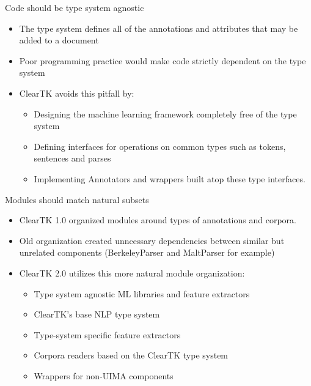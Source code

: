 \documentclass[final]{beamer}
\begin{document}
\begin{frame}{}
\begin{columns}[t]

  \begin{column}{.45\linewidth}
    \begin{block}{Code should be type system agnostic}
    \begin{itemize}
            \item The type system defines all of the annotations and attributes that may be added to a document
            \item Poor programming practice would make code strictly dependent on the type system
            \item ClearTK avoids this pitfall by:
                    \begin{itemize}
                            \item Designing the machine learning framework completely free of the type system
                            \item Defining interfaces for operations on common types such as tokens, sentences and parses
                            \item Implementing Annotators and wrappers built atop these type interfaces.
                    \end{itemize}
    \end{itemize}
                    
    \end{block}

    \begin{block}{Modules should match natural subsets}
            \begin{itemize}
                    \item ClearTK 1.0 organized modules around types of annotations and corpora.
                    \item Old organization created unncessary dependencies between similar but unrelated components (BerkeleyParser and MaltParser for example)
                    \item ClearTK 2.0 utilizes this more natural module organization:
                            \begin{itemize}
                                    \item Type system agnostic ML libraries and feature extractors
                                    \item ClearTK's base NLP type system
                                    \item Type-system specific feature extractors
                                    \item Corpora readers based on the ClearTK type system
                                    \item Wrappers for non-UIMA components
                            \end{itemize}
            \end{itemize}
    \end{block}


\end{column}
\end{columns}
\end{frame}
\end{document}

